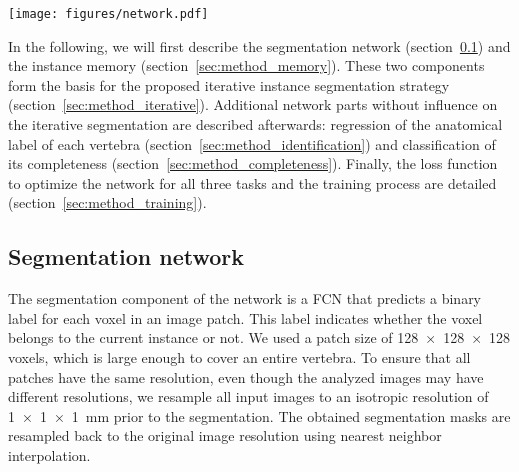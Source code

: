 \documentclass[authoryear,5p,final,times]{elsarticle}
\begin{document}
    \begin{figure*}[t]
        \centering
        \texttt{[image: figures/network.pdf]}
        \caption{Schematic drawing of the network architecture. I, M and S are 3D volumes, L is the predicted label in form of a single value, and C is the predicted probability for complete visibility. Cubes represent 3D feature maps with 84 channels in the path from I and M to S and 48 features maps in the two additional compression paths to L and C. Exceptions are the first cube after I and M, which has two channels as a result of the concatenation of I and M, and the cube before S, which has only one channel. Both dense layers map 48 features to a single value. The number on each cube indicates the size of the feature map (a cube \enquote{\num{128}} corresponds to a feature map of \num{128x128x128} voxels).}
        \label{fig:network}
    \end{figure*}

    In the following, we will first describe the segmentation network (section~\ref{sec:method_segmentation}) and the instance memory (section~\ref{sec:method_memory}). These two components form the basis for the proposed iterative instance segmentation strategy (section~\ref{sec:method_iterative}). Additional network parts without influence on the iterative segmentation are described afterwards: regression of the anatomical label of each vertebra (section~\ref{sec:method_identification}) and classification of its completeness (section~\ref{sec:method_completeness}). Finally, the loss function to optimize the network for all three tasks and the training process are detailed (section~\ref{sec:method_training}).

    \subsection{Segmentation network}
    \label{sec:method_segmentation}

    The segmentation component of the network is a FCN that predicts a binary label for each voxel in an image patch. This label indicates whether the voxel belongs to the current instance or not. We used a patch size of \num{128x128x128} voxels, which is large enough to cover an entire vertebra. To ensure that all patches have the same resolution, even though the analyzed images may have different resolutions, we resample all input images to an isotropic resolution of \SI{1x1x1}{\milli\meter} prior to the segmentation. The obtained segmentation masks are resampled back to the original image resolution using nearest neighbor interpolation.
\end{document}
